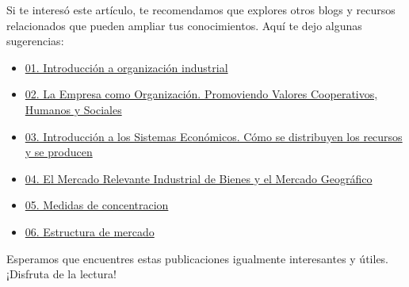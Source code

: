 \documentclass[
  a4paper,
]{article}
\begin{document}
Si te interesó este artículo, te recomendamos que explores otros blogs y
recursos relacionados que pueden ampliar tus conocimientos. Aquí te dejo
algunas sugerencias:

\begin{itemize}
\item
  \href{../2023-06-12-introducion-organizacion-industrial-oi-cap1/index.qmd}{01.
  Introducción a organización industrial}
\item
  \href{../2023-06-13-empresa-como-organizacion-oi-cap1/index.qmd}{02.
  La Empresa como Organización. Promoviendo Valores Cooperativos,
  Humanos y Sociales}
\item
  \href{../2023-06-13-sistemas-economicos-oi.cap1/index.qmd}{03.
  Introducción a los Sistemas Económicos. Cómo se distribuyen los
  recursos y se producen}
\item
  \href{../2023-06-15-mercado-relevante-oi-cap2/index.qmd}{04. El
  Mercado Relevante Industrial de Bienes y el Mercado Geográfico}
\item
  \href{../2023-06-16-concentracion-poder-oi-cap3/index.qmd}{05. Medidas
  de concentracion}
\item
  \href{../2023-06-17-estructura-mercado-oi-cap4/index.qmd}{06.
  Estructura de mercado}
\end{itemize}

Esperamos que encuentres estas publicaciones igualmente interesantes y
útiles. ¡Disfruta de la lectura!


\printbibliography
\end{document}
